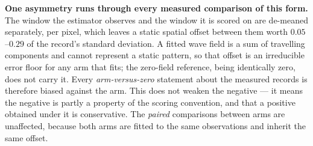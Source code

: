 \documentclass[review]{elsarticle}
\begin{document}
\textbf{One asymmetry runs through every measured comparison of this form.} The window
the estimator observes and the window it is scored on are de-meaned separately, per
pixel, which leaves a static spatial offset between them worth $0.05$--$0.29$ of the
record's standard deviation. A fitted wave field is a sum of travelling components and
cannot represent a static pattern, so that offset is an irreducible error floor for any
arm that fits; the zero-field reference, being identically zero, does not carry it. Every
\emph{arm-versus-zero} statement about the measured records is therefore biased against
the arm. This does not weaken the negative --- it means the negative is partly a property
of the scoring convention, and that a positive obtained under it is conservative. The
\emph{paired} comparisons between arms are unaffected, because both arms are fitted to
the same observations and inherit the same offset.
\end{document}
